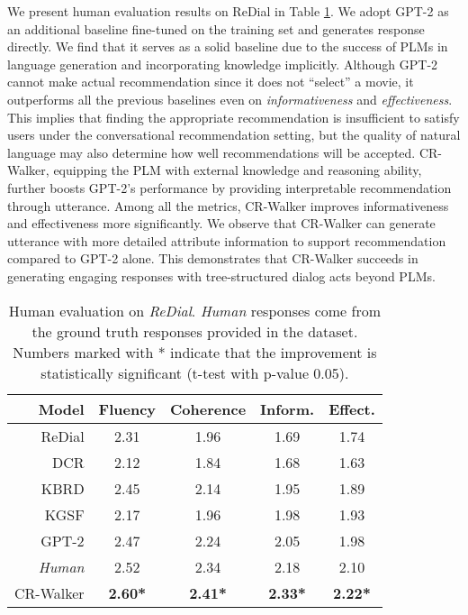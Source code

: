 \documentclass[11pt]{article}
\begin{document}
We present human evaluation results on ReDial in Table \ref{tab:human_redial}. We adopt GPT-2 as an additional baseline fine-tuned on the training set and generates response directly. We find that it serves as a solid baseline due to the success of PLMs in language generation and incorporating knowledge implicitly. Although GPT-2 cannot make actual recommendation since it does not ``select'' a movie, it outperforms all the previous baselines even on \textit{informativeness} and \textit{effectiveness}. This implies that finding the appropriate recommendation is insufficient to satisfy users under the conversational recommendation setting, but the quality of natural language may also determine how well recommendations will be accepted. 
CR-Walker, equipping the PLM with external knowledge and reasoning ability, further boosts GPT-2's performance by providing interpretable recommendation through utterance. Among all the metrics, CR-Walker improves informativeness and effectiveness more significantly. We observe that CR-Walker can generate utterance with more detailed attribute information to support recommendation compared to GPT-2 alone. This demonstrates that CR-Walker succeeds in generating engaging responses with tree-structured dialog acts beyond PLMs.

\begin{table}[tb]
    \centering
    \small
    \begin{tabular}{rcccc}\toprule
Model & Fluency & Coherence & Inform. & Effect. \\\midrule
        ReDial & 2.31 & 1.96 & 1.69 & 1.74\\
        DCR & 2.12 & 1.84 & 1.68 & 1.63\\
        KBRD & 2.45 & 2.14 & 1.95 & 1.89\\
        KGSF & 2.17 & 1.96 & 1.98 & 1.93\\
        GPT-2 & 2.47 & 2.24 & 2.05 & 1.98\\
        \textit{Human} & 2.52 & 2.34 & 2.18 & 2.10\\ 
        CR-Walker & \textbf{2.60*} & \textbf{2.41*} & \textbf{2.33*} & \textbf{2.22*}\\
    \bottomrule
    \end{tabular}
    \caption{Human evaluation on \textit{ReDial}. \textit{Human} responses come from the ground truth responses provided in the dataset. Numbers marked with * indicate that the improvement is statistically significant (t-test with p-value  0.05).}
    \label{tab:human_redial}
\end{table}
\end{document}
